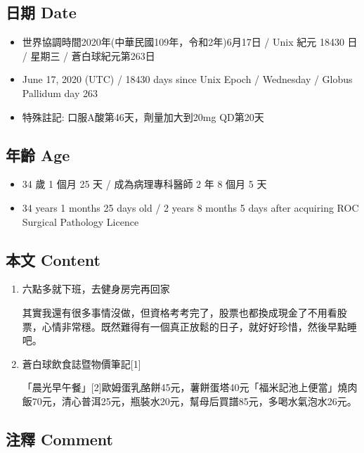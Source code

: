 \documentclass[a5paper, 11pt
]{book}
\providecommand{\tightlist}{%
  \setlength{\itemsep}{0pt}\setlength{\parskip}{0pt}}
\begin{document}
\hypertarget{ux65e5ux671f-date-14}{%
\subsection{日期 Date}\label{ux65e5ux671f-date-14}}

\begin{itemize}
\tightlist
\item
  世界協調時間2020年(中華民國109年，令和2年)6月17日 / Unix 紀元 18430 日
  / 星期三 / 蒼白球紀元第263日
\item
  June 17, 2020 (UTC) / 18430 days since Unix Epoch / Wednesday / Globus
  Pallidum day 263
\item
  特殊註記: 口服A酸第46天，劑量加大到20mg QD第20天
\end{itemize}

\hypertarget{ux5e74ux9f61-age-14}{%
\subsection{年齡 Age}\label{ux5e74ux9f61-age-14}}

\begin{itemize}
\tightlist
\item
  34 歲 1 個月 25 天 / 成為病理專科醫師 2 年 8 個月 5 天
\item
  34 years 1 months 25 days old / 2 years 8 months 5 days after
  acquiring ROC Surgical Pathology Licence
\end{itemize}

\hypertarget{ux672cux6587-content-14}{%
\subsection{本文 Content}\label{ux672cux6587-content-14}}

\begin{enumerate}
\def\labelenumi{\arabic{enumi}.}
\item
  六點多就下班，去健身房完再回家

  其實我還有很多事情沒做，但資格考考完了，股票也都換成現金了不用看股票，心情非常穩。既然難得有一個真正放鬆的日子，就好好珍惜，然後早點睡吧。
\item
  蒼白球飲食誌暨物價筆記{[}1{]}

  「晨光早午餐」{[}2{]}歐姆蛋乳酪餅45元，薯餅蛋塔40元「福米記池上便當」燒肉飯70元，清心普洱25元，瓶裝水20元，幫母后買譜85元，多喝水氣泡水26元。
\end{enumerate}

\hypertarget{ux6ce8ux91cb-comment-14}{%
\subsection{注釋 Comment}\label{ux6ce8ux91cb-comment-14}}
\end{document}
